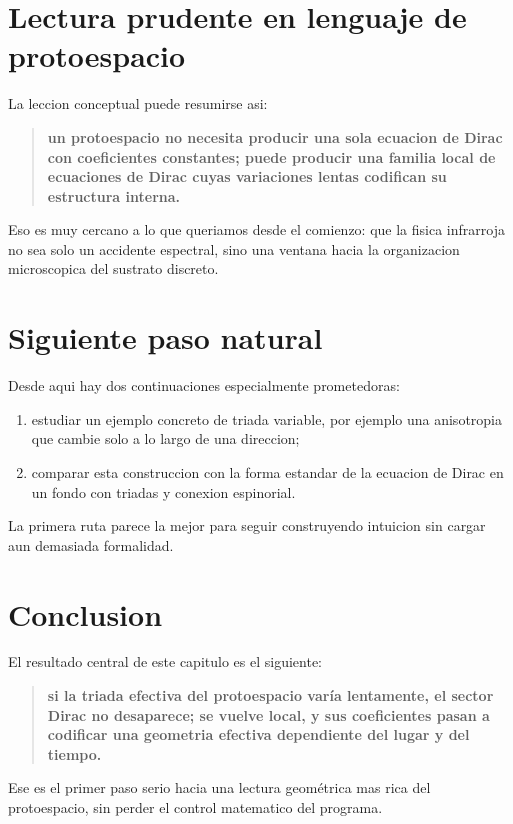 \section{Lectura prudente en lenguaje de protoespacio}
La leccion conceptual puede resumirse asi:
\begin{quote}
\textbf{un protoespacio no necesita producir una sola ecuacion de Dirac con coeficientes constantes; puede producir una familia local de ecuaciones de Dirac cuyas variaciones lentas codifican su estructura interna.}
\end{quote}

Eso es muy cercano a lo que queriamos desde el comienzo: que la fisica infrarroja no sea solo un accidente espectral, sino una ventana hacia la organizacion microscopica del sustrato discreto.

\section{Siguiente paso natural}
Desde aqui hay dos continuaciones especialmente prometedoras:
\begin{enumerate}[label=\arabic*.]
    \item estudiar un ejemplo concreto de triada variable, por ejemplo una anisotropia que cambie solo a lo largo de una direccion;
    \item comparar esta construccion con la forma estandar de la ecuacion de Dirac en un fondo con triadas y conexion espinorial.
\end{enumerate}

La primera ruta parece la mejor para seguir construyendo intuicion sin cargar aun demasiada formalidad.

\section*{Conclusion}
El resultado central de este capitulo es el siguiente:
\begin{quote}
\textbf{si la triada efectiva del protoespacio varía lentamente, el sector Dirac no desaparece; se vuelve local, y sus coeficientes pasan a codificar una geometria efectiva dependiente del lugar y del tiempo.}
\end{quote}

Ese es el primer paso serio hacia una lectura geométrica mas rica del protoespacio, sin perder el control matematico del programa.
